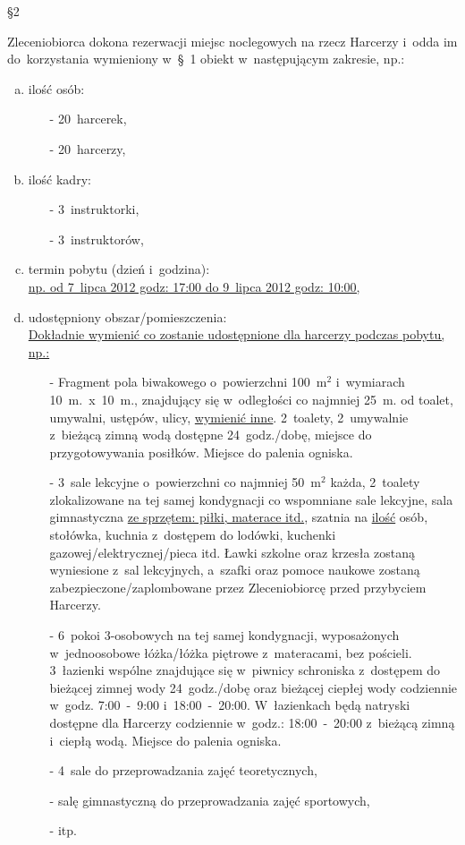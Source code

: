 \begin{center}\S 2\end{center}
Zleceniobiorca dokona rezerwacji miejsc noclegowych na rzecz Harcerzy i~odda im do~korzystania wymieniony w~\S~1 obiekt w~następującym zakresie, np.:
\begin{enumerate}[a)]
\item ilość osób:
\begin{itemize}
\item[-] 20~harcerek,
\item[-] 20~harcerzy,
\end{itemize}
\item ilość kadry:
\begin{itemize}
\item[-] 3~instruktorki,
\item[-] 3~instruktorów,
\end{itemize}
\item termin pobytu (dzień i~godzina):\\
\uline{np. od 7~lipca 2012 godz: 17:00 do 9~lipca 2012 godz: 10:00,}
\item udostępniony obszar/pomieszczenia:\\
\uline{Dokładnie wymienić co zostanie udostępnione dla harcerzy podczas pobytu, np.:}
\begin{itemize}
\item[-] Fragment pola biwakowego o~powierzchni 100~m$^{2}$ i~wymiarach 10~m.~x~10~m., znajdujący się w~odległości co najmniej 25~m. od toalet, umywalni, ustępów, ulicy, \uline{wymienić inne}. 2~toalety, 2~umywalnie z~bieżącą zimną wodą dostępne 24~godz./dobę, miejsce do przygotowywania posiłków. Miejsce do palenia ogniska.
\item[-] 3~sale lekcyjne o~powierzchni co najmniej 50~m$^{2}$ każda, 2~toalety zlokalizowane na tej samej kondygnacji co wspomniane sale lekcyjne, sala gimnastyczna \uline{ze sprzętem: piłki, materace itd.}, szatnia na \uline{ilość} osób, stołówka, kuchnia z~dostępem do lodówki, kuchenki gazowej/elektrycznej/pieca itd. Ławki szkolne oraz krzesła zostaną wyniesione z~sal lekcyjnych, a~szafki oraz pomoce naukowe zostaną zabezpieczone/zaplombowane przez Zleceniobiorcę przed przybyciem Harcerzy.
\item[-] 6~pokoi 3-osobowych na tej samej kondygnacji, wyposażonych w~jednoosobowe łóżka/łóżka piętrowe z~materacami, bez pościeli. 3~łazienki wspólne znajdujące się w~piwnicy schroniska z~dostępem do bieżącej zimnej wody 24~godz./dobę oraz bieżącej ciepłej wody codziennie w~godz. 7:00~-~9:00 i~18:00~-~20:00. W~łazienkach będą natryski dostępne dla Harcerzy codziennie w~godz.: 18:00~-~20:00 z~bieżącą zimną i~ciepłą wodą. Miejsce do palenia ogniska.
\item[-] 4~sale do przeprowadzania zajęć teoretycznych,
\item[-] salę gimnastyczną do przeprowadzania zajęć sportowych,
\item[-] itp.
\end{itemize}
\end{enumerate}

